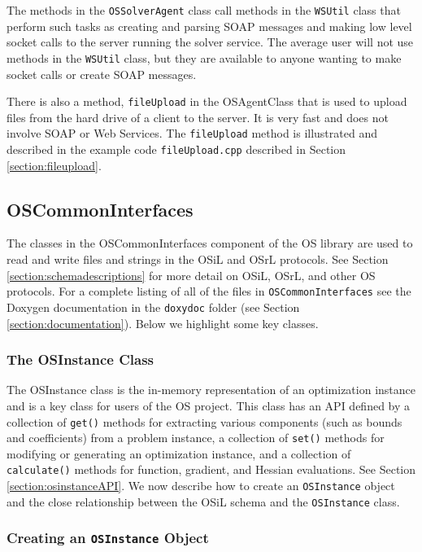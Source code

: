 \documentclass[11pt]{article}
\renewcommand{\_}{{\char"5F}}
\renewcommand{\{}{{\char"7B}}
\renewcommand{\}}{{\char"7D}}
\renewcommand{\^}{{\char"0D}}
\renewcommand{\'}{{\char"0D}}
\begin{document}
The methods in the {\tt OSSolverAgent} class call methods in the {\tt WSUtil} class that perform such tasks as creating and parsing SOAP messages and making low level socket calls to the server running the solver service. The average user will not use methods in the {\tt WSUtil} class, but they are available to anyone wanting to make socket calls or create SOAP messages.

There is also a method, {\tt fileUpload} in the OSAgentClass that is used to upload files from the hard drive of a client to the server. It is very fast and does not involve SOAP or Web Services. The {\tt fileUpload}  method is illustrated and described in the example code {\tt fileUpload.cpp} described in Section \ref{section:fileupload}.

\subsection{OSCommonInterfaces}

The classes in the OSCommonInterfaces component of the OS library are  used  to read and write files and strings in the OSiL and OSrL protocols. See Section \ref{section:schemadescriptions} for more detail on OSiL, OSrL, and other OS protocols. For a complete listing of all of the files in {\tt OSCommonInterfaces} see the Doxygen documentation in the {\tt doxydoc} folder (see Section \ref{section:documentation}).  Below we highlight some key classes.





\subsubsection{The OSInstance Class}\label{section:osinstanceclass}

The OSInstance class is the in-memory representation of an optimization instance and is a key class for users of the OS project. This class has an API defined by a collection of {\tt get()} methods for extracting various components (such as bounds and coefficients) from a problem instance, a collection of {\tt set()} methods for modifying or generating an optimization instance, and a collection of {\tt calculate()} methods for function, gradient, and Hessian evaluations.  See Section \ref{section:osinstanceAPI}.  We now describe how to create an {\tt OSInstance} object and the close relationship between the OSiL schema and the {\tt OSInstance} class.

\subsubsection{Creating an {\tt OSInstance} Object}
\end{document}
